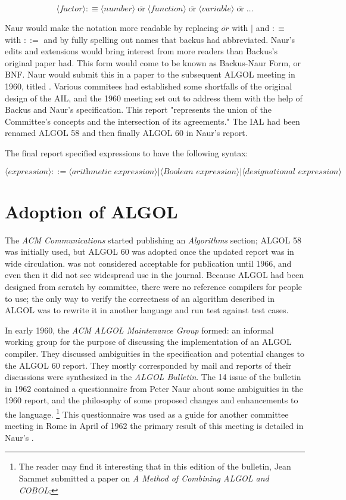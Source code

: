 \[
\langle \textit{factor} \rangle :\equiv
\langle \textit{number} \rangle \;\overline{\text{or}}\;
\langle \textit{function} \rangle \;\overline{\text{or}}\;
\langle \textit{variable} \rangle \;\overline{\text{or}}\;
\dots
\]

Naur would make the notation more readable by replacing $\overbar{or}$ with $|$
and $:\equiv$ with $::=$ and by fully spelling out names that backus had abbreviated.
Naur's edits and extensions would bring interest from more readers than Backus's original paper had.
This form would come to be known as Backus-Naur Form, or BNF.
Naur would submit this in a paper to the subsequent ALGOL meeting in 1960,
titled \cite{naur_backus_algol_1960}.
Various commitees had established some shortfalls of the original design of the AIL,
and the 1960 meeting set out to address them with the help of Backus and Naur's
specification.
This report "represents the union of the Committee's concepts and the
intersection of its agreements."
The IAL had been renamed ALGOL 58 and then finally ALGOL 60 in Naur's report.

The final report specified expressions to have the following syntax:

\[
\langle \textit{expression} \rangle ::=
\langle \textit{arithmetic expression} \rangle
| \langle \textit{Boolean expression} \rangle
| \langle \textit{designational expression} \rangle
\]

\section{Adoption of ALGOL}

The \textit{ACM Communications} started publishing an \textit{Algorithms} section;
ALGOL 58 was initially used, but ALGOL 60 was adopted once the updated report
was in wide circulation.
\FTN was not considered acceptable for publication until 1966, and even then
it did not see widespread use in the journal.
Because ALGOL had been designed from scratch by committee, there were
no reference compilers for people to use; the only way to verify the correctness
of an algorithm described in ALGOL was to rewrite it in another language
and run test against test cases.

In early 1960, the \textit{ACM ALGOL Maintenance Group} formed: an informal working
group for the purpose of discussing the implementation of an ALGOL compiler.
They discussed ambiguities in the specification and potential changes to the ALGOL 60 report.
They mostly corresponded by mail and reports of their discussions were synthesized in
the \textit{ALGOL Bulletin}\cite{sammet_programming_languages_history_and_fundamentals_1969}.
The 14 issue of the bulletin in 1962 contained a questionnaire from Peter Naur
about some ambiguities in the 1960 report, and the philosophy of some proposed changes and
enhancements to the language.
\footnote{The reader may find it interesting that in this edition of the bulletin,
Jean Sammet submitted a paper on \textit{A Method of Combining ALGOL and COBOL};
}
This questionnaire was used as a guide for another committee meeting in Rome in April of 1962
the primary result of this meeting is detailed in Naur's
.

